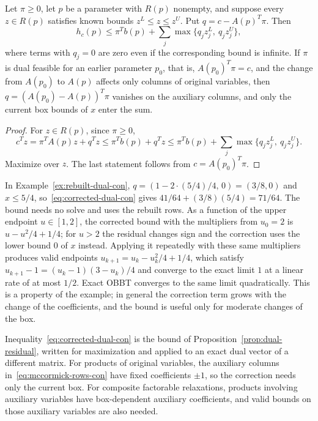 \begin{proposition}\label{prop:corrected-dual-con}
Let $\pi\ge0$, let $p$ be a parameter with $R(p)$ nonempty, and suppose
every $z\in R(p)$ satisfies known bounds $z^L\le z\le z^U$. Put
$q=c-A(p)^T\pi$. Then
\begin{equation}\label{eq:corrected-dual-con}
 h_c(p)\le\pi^Tb(p)+\sum_{j}\max\{q_jz^L_j,\ q_jz^U_j\},
\end{equation}
where terms with $q_j=0$ are zero even if the corresponding bound is
infinite. If $\pi$ is dual feasible for an earlier parameter $p_0$, that
is, $A(p_0)^T\pi=c$, and the change from $A(p_0)$ to $A(p)$ affects only
columns of original variables, then $q=(A(p_0)-A(p))^T\pi$ vanishes on the
auxiliary columns, and only the current box bounds of $x$ enter the sum.
\end{proposition}

\begin{proof}
For $z\in R(p)$, since $\pi\ge0$,
\[
 c^Tz=\pi^TA(p)z+q^Tz\le\pi^Tb(p)+q^Tz
 \le\pi^Tb(p)+\sum_j\max\{q_jz^L_j,\ q_jz^U_j\}.
\]
Maximize over $z$. The last statement follows from $c=A(p_0)^T\pi$.
\end{proof}

In Example~\ref{ex:rebuilt-dual-con}, $q=(1-2\cdot(5/4)/4,\,0)=(3/8,0)$
and $x\le5/4$, so~\eqref{eq:corrected-dual-con} gives
$41/64+(3/8)(5/4)=71/64$. The bound needs no solve and uses the rebuilt
rows. As a function of the upper endpoint $u\in[1,2]$, the corrected
bound with the multipliers from $u_0=2$ is $u-u^2/4+1/4$; for $u>2$ the
residual changes sign and the correction uses the lower bound $0$ of $x$
instead. Applying it repeatedly with
these same multipliers produces valid endpoints $u_{k+1}=u_k-u_k^2/4+1/4$,
which satisfy $u_{k+1}-1=(u_k-1)(3-u_k)/4$ and converge to the exact limit
$1$ at a linear rate of at most $1/2$. Exact OBBT converges to the same
limit quadratically. This is a property of the example; in general the
correction term grows with the change of the coefficients, and the bound is
useful only for moderate changes of the box.

Inequality~\eqref{eq:corrected-dual-con} is the bound of
Proposition~\ref{prop:dual-residual}, written for maximization and applied
to an exact dual vector of a different matrix. For products of original
variables, the auxiliary columns in~\eqref{eq:mccormick-rows-con} have
fixed coefficients $\pm1$, so the correction needs only the current box.
For composite factorable relaxations, products involving auxiliary
variables have box-dependent auxiliary coefficients, and valid bounds on
those auxiliary variables are also needed.

